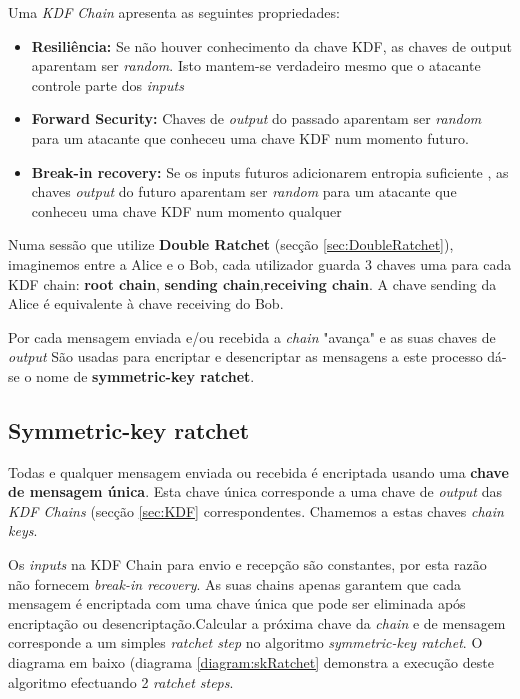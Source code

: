 Uma \emph{KDF Chain} apresenta as seguintes propriedades:

\begin{itemize}
    \item \textbf{Resiliência:} Se não houver conhecimento da chave KDF, as chaves de output aparentam ser \emph{random}. Isto mantem-se verdadeiro mesmo que o atacante controle parte dos \emph{inputs}
    \item \textbf{Forward Security:} Chaves de \textit{output} do passado aparentam ser \emph{random} para um atacante que conheceu uma chave KDF num momento futuro.
    \item \textbf{Break-in recovery:} Se os inputs futuros adicionarem entropia suficiente , as chaves \textit{output} do futuro aparentam ser \emph{random} para um atacante que conheceu uma chave KDF num momento qualquer
\end{itemize}

Numa sessão que utilize \textbf{Double Ratchet} (secção \ref{sec:DoubleRatchet}), imaginemos entre a Alice e o Bob, cada utilizador guarda 3 chaves uma para cada KDF chain: \textbf{root chain}, \textbf{sending chain},\textbf{receiving chain}. A chave sending da Alice é equivalente à chave receiving do Bob.

Por cada mensagem enviada e/ou recebida a \emph{chain} "avança" e as suas chaves de \emph{output} São usadas para encriptar e desencriptar as mensagens a este processo dá-se o nome de \textbf{symmetric-key ratchet}.

\subsection{Symmetric-key ratchet}\label{sec:symkey}
Todas e qualquer mensagem enviada ou recebida é encriptada usando uma \textbf{chave de mensagem única}. Esta chave única corresponde a uma chave de \textit{output} das \textit{KDF Chains} (secção \ref{sec:KDF} correspondentes. Chamemos a estas chaves \textit{chain keys}.

Os \textit{inputs} na KDF Chain para envio e recepção são constantes, por esta razão não fornecem \textit{break-in recovery}. As suas chains apenas garantem que cada mensagem é encriptada com uma chave única que pode ser eliminada após encriptação ou desencriptação.Calcular a próxima chave da \textit{chain} e de mensagem corresponde a um simples \textit{ratchet step} no algoritmo \textit{symmetric-key ratchet}.
O diagrama em baixo (diagrama \ref{diagram:skRatchet} demonstra a execução deste algoritmo efectuando 2 \textit{ratchet steps}.

